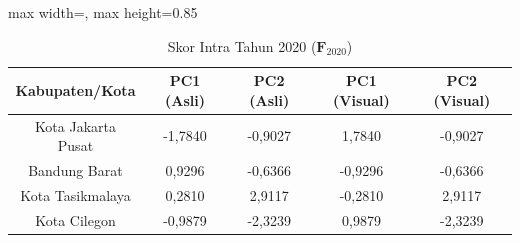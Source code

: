 \begin{table}[H]
\centering
\caption{Skor Intra Tahun 2020 ($\mathbf{F}_{2020}$)} \label{tab:sample1skor_intra_2020}
\begin{adjustbox}{max width=\textwidth, max height=0.85\textheight}
\begin{tabular}{|c|c|c|c|c|}
\hline
\textbf{Kabupaten/Kota} & \textbf{PC1 (Asli)} & \textbf{PC2 (Asli)} & \textbf{PC1 (Visual)} & \textbf{PC2 (Visual)} \\
\hline
Kota Jakarta Pusat & -1,7840 & -0,9027 & 1,7840 & -0,9027 \\
Bandung Barat & 0,9296 & -0,6366 & -0,9296 & -0,6366 \\
Kota Tasikmalaya & 0,2810 & 2,9117 & -0,2810 & 2,9117 \\
Kota Cilegon & -0,9879 & -2,3239 & 0,9879 & -2,3239 \\
\hline
\end{tabular}
\end{adjustbox}
\end{table}